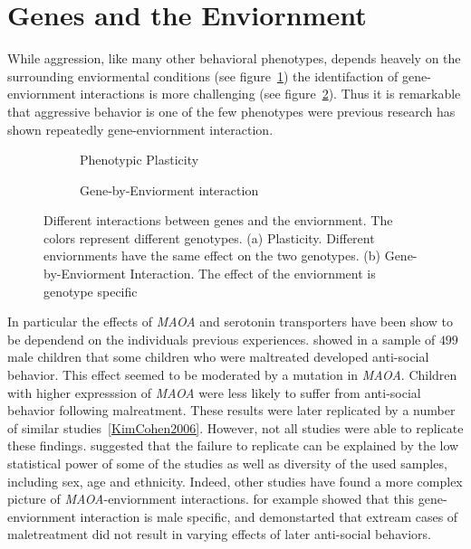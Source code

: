 \section{Genes and the Enviornment}
\label{sec:gene_enviornment_interactions}

While aggression, like many other behavioral phenotypes, depends heavely on the surrounding enviormental conditions (see figure~\ref{fig:plasticity}) the identifaction of gene-enviornment interactions is more challenging (see figure~\ref{fig:gene_env_interaction}).
Thus it is remarkable that aggressive behavior is one of the few phenotypes were previous research has shown repeatedly gene-enviornment interaction.

\begin{figure}[!htp]
  \centering
  \begin{subfigure}[b]{0.5\textwidth}
    \centering
    \resizebox{\linewidth}{!}{}
    \caption{Phenotypic Plasticity}\label{fig:plasticity}
  \end{subfigure}
  \begin{subfigure}[b]{0.5\textwidth}
    \centering
    \resizebox{\linewidth}{!}{}
    \caption{Gene-by-Enviorment interaction}\label{fig:gene_env_interaction}
  \end{subfigure}
  \caption{Different interactions between genes and the enviornment. 
    The colors represent different genotypes. 
    (a) Plasticity. Different enviornments have the same effect on the two genotypes.
    (b) Gene-by-Enviorment Interaction. The effect of the enviornment is genotype specific}\label{fig:env_interactions}
\end{figure}

In particular the effects of \textit{MAOA} and serotonin transporters have been show to be dependend on the individuals previous experiences.
\citet{Caspi2002} showed in a sample of $499$ male children that some children who were maltreated developed anti-social behavior.
This effect seemed to be moderated by a mutation in \textit{MAOA}.
Children with higher expresssion of \textit{MAOA} were less likely to suffer from anti-social behavior following malreatment.
These results were later replicated by a number of similar studies~\ref{KimCohen2006}.
However, not all studies were able to replicate these findings.
\citet{Anholt2012} suggested that the failure to replicate can be explained by the low statistical power of some of the studies as well as diversity of the used samples, including sex, age and ethnicity.
Indeed, other studies have found a more complex picture of \textit{MAOA}-enviornment interactions.
\citet{Huang2004} for example showed that this gene-enviornment interaction is male specific, and \citet{Weder2009} demonstarted that extream cases of maletreatment did not result in varying effects of later anti-social behaviors.

